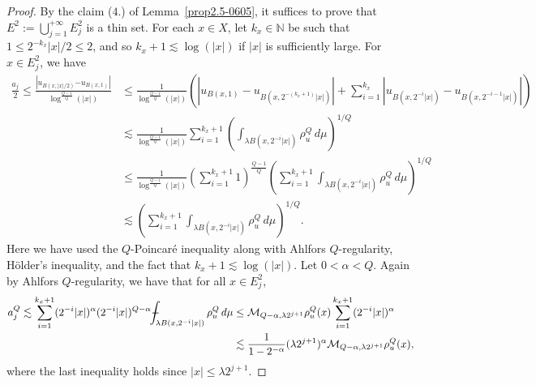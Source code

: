 \documentclass[10pt]{amsart}
\def\Xint#1{\mathchoice
	{\XXint\displaystyle\textstyle{#1}}
	{\XXint\textstyle\scriptstyle{#1}}
	{\XXint\scriptstyle\scriptscriptstyle{#1}}
	{\XXint\scriptscriptstyle\scriptscriptstyle{#1}}
	\!\int}
\def\XXint#1#2#3{{\setbox0=\hbox{$#1{#2#3}{\int}$ }
		\vcenter{\hbox{$#2#3$ }}\kern-.6\wd0}}
\def\dashint{\Xint-}
\numberwithin{equation}{section}
\begin{document}
\begin{proof}
By the claim ($4.$) of Lemma~\ref{prop2.5-0605}, it suffices to prove that $E^2:=\bigcup_{j=1}^{+\infty} E_j^2$ is a thin set. For each $x\in X$, let $k_x\in \mathbb N$ be such that $1\leq 2^{-k_x} |x|/2\leq 2$, and so $k_x+1 \lesssim \log(|x|)$ if $|x|$ is sufficiently large. For $x\in E_j^2$, we have 
	\begin{align*}
	\frac{a_j}{2}\leq \frac{|u_{B(x,|x|/2)}{-u_{B(x,1)}}|}{\log^{\frac{Q-1}{Q}}(|x|)}
	 &\leq\frac{1}{\log^{\frac{Q-1}{Q}}(|x|)}\left(|u_{B(x,1)}-u_{B(x,2^{-(k_x+1)}|x|)}|+\sum_{i=1}^{k_x}|u_{B(x,2^{-i}|x|)}-u_{B(x,2^{-i-1}|x|)}|\right)\\
    &\lesssim\frac{1}{\log^{\frac{Q-1}{Q}}(|x|)}\sum_{i=1}^{k_x+1}\left(\int_{\lambda B(x,2^{-i}|x|)}\rho_u^Q\,d\mu\right)^{1/Q}\\  
    &\le\frac{1}{\log^{\frac{Q-1}{Q}}(|x|)}\left(\sum_{i=1}^{k_x+1}1\right)^{\frac{Q-1}{Q}}\left(\sum_{i=1}^{k_x+1}\int_{\lambda B(x,2^{-i}|x|)}\rho_u^Q\,d\mu\right)^{1/Q}\\
    &\lesssim\left(\sum_{i=1}^{k_x+1}\int_{\lambda B(x,2^{-i}|x|)}\rho_u^Q\,d\mu\right)^{1/Q}.
    \end{align*}
Here we have used the $Q$-Poincar\'e inequality along with Ahlfors $Q$-regularity, H\"older's inequality, and the fact that $k_x+1\lesssim\log(|x|)$. Let $0<\alpha<Q$. Again by Ahlfors $Q$-regularity, we have that for 
all $x\in E^2_j$, 
\begin{align*}
a_j^Q\lesssim\sum_{i=1}^{k_x+1}(2^{-i}|x|)^\alpha(2^{-i}|x|)^{Q-\alpha}\dashint_{\lambda B(x,2^{-i}|x|)}\rho_u^Q\,d\mu&\le\mathcal M_{Q-\alpha,\lambda2^{j+1}}\rho_u^Q(x)\sum_{i=1}^{k_x+1}(2^{-i}|x|)^\alpha\\
    &\lesssim \frac{1}{1-2^{-\alpha}} (\lambda 2^{j+1})^\alpha\mathcal M_{Q-\alpha,\lambda2^{j+1}}\rho_u^Q(x),
\end{align*}
where the last inequality holds since $|x|\le \lambda 2^{j+1}$.

\end{proof}
\end{document}
